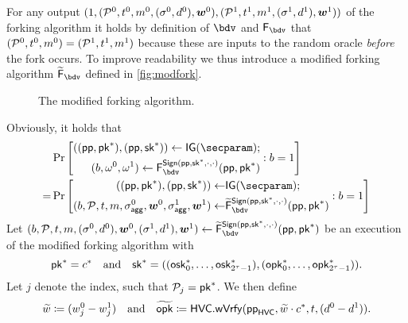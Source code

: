   For any output $(1,(\mathcal{P}^0,t^0,m^0,(\sigma^0,d^0),\boldsymbol{w}^0),(\mathcal{P}^1,t^1,m^1,(\sigma^1,d^1),\boldsymbol{w}^1))$ of the forking algorithm it holds by definition of $\bdv$ and $\fork_\bdv$ that $(\mathcal{P}^0,t^0,m^0)=(\mathcal{P}^1,t^1,m^1)$ because these are inputs to the random oracle \emph{before} the fork occurs.
  To improve readability we thus introduce a modified forking algorithm $\widetilde\fork_\bdv$ defined in \autoref{fig:modfork}.
  \begin{figure}[tb]
  \centering
  \caption{The modified forking algorithm.}\label{fig:modfork}
  \end{figure}
  Obviously, it holds that
  \begin{align}
    &\Pr\left[\begin{aligned}((\params,\pk^*),(\params,\sk^*)) \gets \IG(\secparam);\\ (b,\omega^0,\omega^1)\gets \fork^{\sign(\params,\sk^*,\cdot,\cdot)}_\bdv(\params,\pk^*)\end{aligned} : b=1 \right]\nonumber\\
    =&\Pr\left[\begin{aligned}((\params,\pk^*),(\params,\sk^*)) \gets& \IG(\secparam);\\ (b,\pubkeys,t,m,\aggsig^0,\vec{w}^0,\aggsig^1,\vec{w}^1)\gets& \widetilde\fork^{\sign(\params,\sk^*,\cdot,\cdot)}_\bdv(\params,\pk^*)\end{aligned} : b=1 \right]\label{eq:forkprob}
  \end{align}
  Let $(b,\pubkeys,t,m,(\sigma^0,d^0),\vec{w}^0,(\sigma^1,d^1),\vec{w}^1) \gets \widetilde\fork_\bdv^{\sign(\params,\sk^*,\cdot,\cdot)}(\params,\pk^*)$ be an execution of the modified forking algorithm with \[\mathsf{pk}^* = c^*\quad\text{and}\quad\mathsf{sk}^* = ((\mathsf{osk}^*_0,\dots,\mathsf{osk}^*_{2^\tau-1}),(\mathsf{opk}^*_0,\dots,\mathsf{opk}^*_{2^\tau-1})).\]
  Let $j$ denote the index, such that $\mathcal{P}_j=\mathsf{pk}^*$.
  We then define \[\widetilde w \coloneqq (w^0_j - w^1_j)\quad\text{and}\quad
%  
    \widetilde\opk \coloneqq  \hvc.\wverify(\params_\hvc,\widetilde w\cdot c^* ,t,(d^0-d^1)).
  \]
